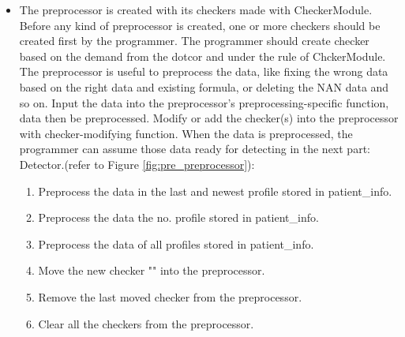 \documentclass{article}
\begin{document}
\begin{itemize}
    \item  The preprocessor is created with its checkers made with CheckerModule. Before any kind of preprocessor is created, one or more checkers should be created first by the programmer. The programmer should create checker based on the demand from the dotcor and under the rule of ChckerModule. The preprocessor is useful to preprocess the data, like fixing the wrong data based on the right data and existing formula, or deleting the NAN data and so on. Input the data into the preprocessor's preprocessing-specific function, data then be preprocessed. Modify or add the checker(s) into the preprocessor with checker-modifying function. When the data is preprocessed, the programmer can assume those data ready for detecting in the next part: Detector.(refer to Figure \ref{fig:pre_preprocessor}):
    \begin{enumerate}[label=(\roman*)]
        \item {} Preprocess the data in the last and newest profile stored in patient\_info.
        \item {} Preprocess the data the no. profile stored in patient\_info.
        \item {} Preprocess the data of all profiles stored in patient\_info.
        \item {} Move the new checker "" into the preprocessor.
        \item {} Remove the last moved checker from the preprocessor.
        \item {} Clear all the checkers from the preprocessor.
    \end{enumerate}
\end{itemize}
\end{document}
